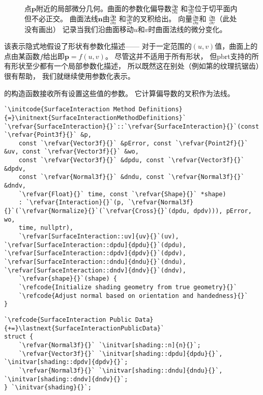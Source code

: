 \begin{figure}[htbp]
    \centering
    \caption{点$\bm p$附近的局部微分几何。曲面的参数化偏导数$\displaystyle\frac{\partial \bm p}{\partial u}$
        和$\displaystyle\frac{\partial \bm p}{\partial v}$位于切平面内但不必正交。
        曲面法线$\bm n$由$\displaystyle\frac{\partial \bm p}{\partial u}$
        和$\displaystyle\frac{\partial \bm p}{\partial v}$的叉积给出。
        向量$\displaystyle\frac{\partial \bm n}{\partial u}$和
        $\displaystyle\frac{\partial \bm n}{\partial v}$（此处没有画出）
        记录当我们沿曲面移动$u$和$v$时曲面法线的微分变化。}
    \label{fig:2.19}
\end{figure}

该表示隐式地假设了形状有参数化描述——
对于一定范围的$(u,v)$值，曲面上的点由某函数$f$给出即$\bm p=f(u,v)$。
尽管这并不适用于所有形状，
但pbrt支持的所有形状至少都有一个局部参数化描述，
所以既然这在别处（例如第的纹理抗锯齿）很有帮助，
我们就继续使用参数化表示。

的构造函数接收所有设置这些值的参数。
它计算偏导数的叉积作为法线。
\begin{lstlisting}
`\initcode{SurfaceInteraction Method Definitions}{=}\initnext{SurfaceInteractionMethodDefinitions}`
`\refvar{SurfaceInteraction}{}`::`\refvar{SurfaceInteraction}{}`(const `\refvar{Point3f}{}` &p,
    const `\refvar{Vector3f}{}` &pError, const `\refvar{Point2f}{}` &uv, const `\refvar{Vector3f}{}` &wo,
    const `\refvar{Vector3f}{}` &dpdu, const `\refvar{Vector3f}{}` &dpdv,
    const `\refvar{Normal3f}{}` &dndu, const `\refvar{Normal3f}{}` &dndv,
    `\refvar{Float}{}` time, const `\refvar{Shape}{}` *shape)
    : `\refvar{Interaction}{}`(p, `\refvar{Normal3f}{}`(`\refvar{Normalize}{}`(`\refvar{Cross}{}`(dpdu, dpdv))), pError, wo,
    time, nullptr),
    `\refvar[SurfaceInteraction::uv]{uv}{}`(uv), `\refvar[SurfaceInteraction::dpdu]{dpdu}{}`(dpdu), `\refvar[SurfaceInteraction::dpdv]{dpdv}{}`(dpdv), `\refvar[SurfaceInteraction::dndu]{dndu}{}`(dndu), `\refvar[SurfaceInteraction::dndv]{dndv}{}`(dndv),
    `\refvar{shape}{}`(shape) {
    `\refcode{Initialize shading geometry from true geometry}{}`
    `\refcode{Adjust normal based on orientation and handedness}{}`
}
\end{lstlisting}

\begin{lstlisting}
`\refcode{SurfaceInteraction Public Data}{+=}\lastnext{SurfaceInteractionPublicData}`
struct {
    `\refvar{Normal3f}{}` `\initvar[shading::n]{n}{}`;
    `\refvar{Vector3f}{}` `\initvar[shading::dpdu]{dpdu}{}`, `\initvar[shading::dpdv]{dpdv}{}`;
    `\refvar{Normal3f}{}` `\initvar[shading::dndu]{dndu}{}`, `\initvar[shading::dndv]{dndv}{}`;
} `\initvar{shading}{}`;
\end{lstlisting}